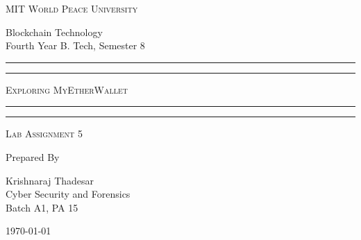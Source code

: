 \documentclass[11pt]{article}
\begin{document}
\begin{titlepage}
	\centering


	\huge\textsc{
		MIT World Peace University
	}\\

	\vspace{0.75\baselineskip} %

	\LARGE{
        Blockchain Technology\\
		Fourth Year B. Tech, Semester 8
	}

	\vfill %


	\rule{\textwidth}{1.6pt}\vspace*{-\baselineskip}\vspace*{2pt}
	\rule{\textwidth}{0.6pt}
	\vspace{0.75\baselineskip} %

	\huge{\textsc{
        Exploring MyEtherWallet
        }} \\

	\vspace{0.5\baselineskip} %
	\rule{\textwidth}{0.6pt}\vspace*{-\baselineskip}\vspace*{2.8pt}
	\rule{\textwidth}{1.6pt}

	\vspace{1\baselineskip} %


	\LARGE\textsc{
		Lab Assignment 5
	} %
	\vfill


	Prepared By \vspace{0.5\baselineskip} %

	\Large{
		Krishnaraj Thadesar \\
		Cyber Security and Forensics\\
        Batch A1, PA 15
	}

	\vspace{0.5\baselineskip} %
	\today

\end{titlepage}
\end{document}
